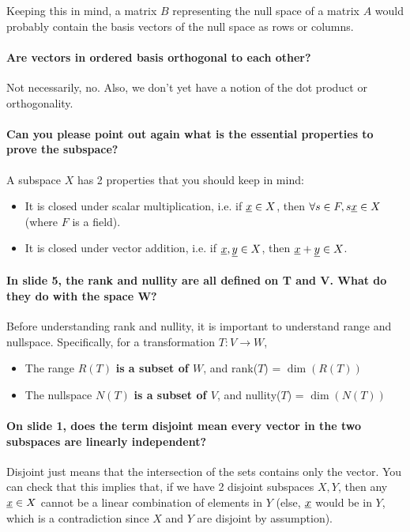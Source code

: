 \documentclass[10pt,english]{article}
\begin{document}
Keeping this in mind, a matrix $B$ representing the null space of a matrix $A$ would probably contain the basis vectors of the null space as rows or columns.

\paragraph{Are vectors in ordered basis orthogonal to each other?}

Not necessarily, no.
Also, we don't yet have a notion of the dot product or orthogonality.

\paragraph{Can you please point out again what is the essential properties to prove the subspace?}

A subspace $X$ has 2 properties that you should keep in mind:
\begin{itemize}
    \item It is closed under scalar multiplication, i.e. if $\underline{x}\in X$, then $\forall s\in F, s\underline{x} \in X$ (where $F$ is a field).
    \item It is closed under vector addition, i.e. if $\underline{x},\underline{y} \in X $, then $\underline{x}+\underline{y} \in X$.
\end{itemize}

\paragraph{In slide 5, the rank and nullity are all defined on T and V. What do they do with the space W?}
Before understanding rank and nullity, it is important to understand range and nullspace.
Specifically, for a transformation $T:V \rightarrow W$, 
\begin{itemize}
    \item The range $R(T)$ \textbf{is a subset of $W$}, and rank($T$) = $\dim(R(T))$
    \item The nullspace $N(T)$ \textbf{is a subset of $V$}, and nullity($T$) = $\dim(N(T))$
\end{itemize}

\paragraph{On slide 1, does the term disjoint mean every vector in the two subspaces are linearly independent?}
Disjoint just means that the intersection of the sets contains only the  vector. You can check that this implies that, if we have 2 disjoint subspaces $X,Y$, then any $\underline{x}\in X$ cannot be a linear combination of elements in $Y$ (else, $\underline{x}$ would be in $Y$, which is a contradiction since $X$ and $Y$ are disjoint by assumption).
\end{document}
